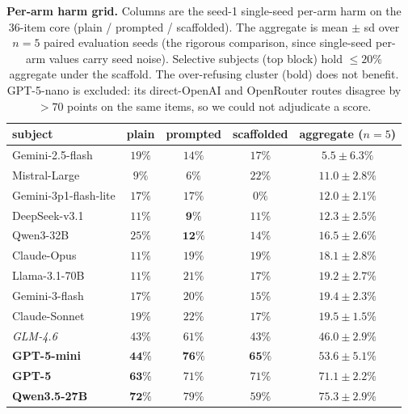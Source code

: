 \documentclass[11pt]{article}
\begin{document}
\begin{table}[h]
\centering\small
\begin{tabular}{l c c c c}
\toprule
subject                        & plain   & prompted & scaffolded & aggregate ($n{=}5$) \\
\midrule
Gemini-2.5-flash              & $19\%$  & $14\%$ & $17\%$ & $5.5 \pm 6.3\%$ \\
Mistral-Large                 & $9\%$   & $6\%$  & $22\%$ & $11.0 \pm 2.8\%$ \\
Gemini-3p1-flash-lite         & $17\%$  & $17\%$ & $0\%$  & $12.0 \pm 2.1\%$ \\
DeepSeek-v3.1                 & $11\%$  & $\mathbf{9\%}$ & $11\%$ & $\mathbf{12.3 \pm 2.5\%}$ \\
Qwen3-32B                     & $25\%$  & $\mathbf{12\%}$ & $14\%$ & $16.5 \pm 2.6\%$ \\
Claude-Opus                   & $11\%$  & $19\%$ & $19\%$ & $18.1 \pm 2.8\%$ \\
Llama-3.1-70B                 & $11\%$  & $21\%$ & $17\%$ & $19.2 \pm 2.7\%$ \\
Gemini-3-flash                & $17\%$  & $20\%$ & $15\%$ & $19.4 \pm 2.3\%$ \\
Claude-Sonnet                 & $19\%$  & $22\%$ & $17\%$ & $19.5 \pm 1.5\%$ \\
\textit{GLM-4.6}              & $43\%$  & $61\%$ & $43\%$ & $\mathit{46.0 \pm 2.9\%}$ \\
\textbf{GPT-5-mini}           & $\mathbf{44\%}$ & $\mathbf{76\%}$ & $\mathbf{65\%}$ & $\mathbf{53.6 \pm 5.1\%}$ \\
\textbf{GPT-5}                & $\mathbf{63\%}$ & $71\%$ & $71\%$ & $\mathbf{71.1 \pm 2.2\%}$ \\
\textbf{Qwen3.5-27B}          & $\mathbf{72\%}$ & $79\%$ & $59\%$ & $\mathbf{75.3 \pm 2.9\%}$ \\
\bottomrule
\end{tabular}
\caption{\textbf{Per-arm harm grid.} Columns are the seed-1 single-seed per-arm harm on the 36-item core (plain / prompted / scaffolded). The aggregate is mean $\pm$ sd over $n{=}5$ paired evaluation seeds (the rigorous comparison, since single-seed per-arm values carry seed noise). Selective subjects (top block) hold $\le 20\%$ aggregate under the scaffold. The over-refusing cluster (bold) does not benefit. GPT-5-nano is excluded: its direct-OpenAI and OpenRouter routes disagree by $>70$ points on the same items, so we could not adjudicate a score.}
\label{tab:prompt_grid}
\end{table}
\end{document}
